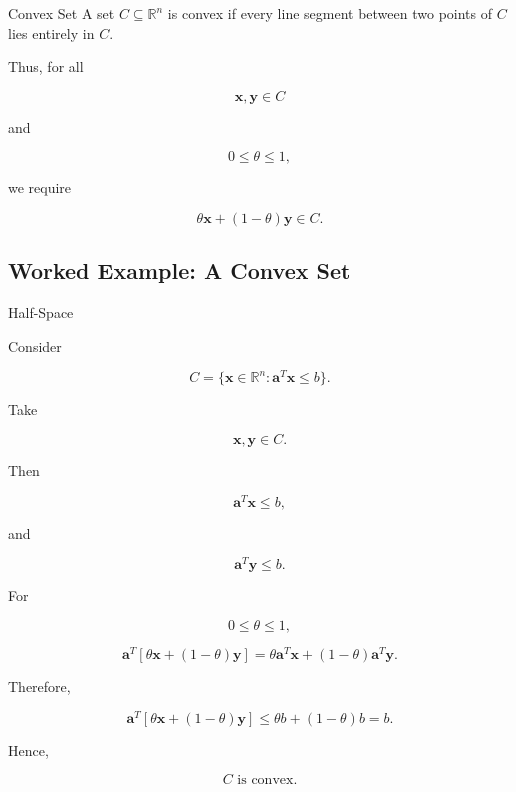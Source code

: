 \begin{definitionbox}{Convex Set}
A set \(C\subseteq\mathbb{R}^n\) is convex if every line segment between
two points of \(C\) lies entirely in \(C\).
\end{definitionbox}

Thus, for all

\[
\mathbf{x},\mathbf{y}\in C
\]

and

\[
0\leq\theta\leq1,
\]

we require

\[
\boxed{
\theta\mathbf{x}
+
(1-\theta)\mathbf{y}
\in C.
}
\]

\subsection{Worked Example: A Convex Set}
\label{subsec:worked-convex-set}

\begin{workedexamplebox}{Half-Space}

Consider

\[
C
=
\{
\mathbf{x}\in\mathbb{R}^n:
\mathbf{a}^T\mathbf{x}\leq b
\}.
\]

Take

\[
\mathbf{x},\mathbf{y}\in C.
\]

Then

\[
\mathbf{a}^T\mathbf{x}\leq b,
\]

and

\[
\mathbf{a}^T\mathbf{y}\leq b.
\]

For

\[
0\leq\theta\leq1,
\]

\[
\mathbf{a}^T
[
\theta\mathbf{x}
+
(1-\theta)\mathbf{y}
]
=
\theta\mathbf{a}^T\mathbf{x}
+
(1-\theta)\mathbf{a}^T\mathbf{y}.
\]

Therefore,

\[
\mathbf{a}^T
[
\theta\mathbf{x}
+
(1-\theta)\mathbf{y}
]
\leq
\theta b+(1-\theta)b
=
b.
\]

Hence,

\begin{answerbox}
\[
\boxed{
C
\text{ is convex}.
}
\]
\end{answerbox}

\end{workedexamplebox}

